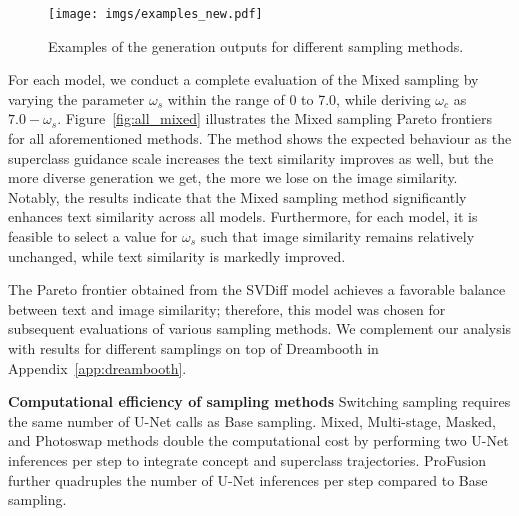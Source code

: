 \begin{figure*}[ht!]
  \centering
  \texttt{[image: imgs/examples\_new.pdf]}
  \vspace{-0.20in}
  \caption{Examples of the generation outputs for different sampling methods.}
  \label{fig:examples}
  \vspace{-0.21in}
\end{figure*}
For each model, we conduct a complete evaluation of the Mixed sampling by varying the parameter \(\omega_s\) within the range of 0 to 7.0, while deriving \(\omega_c\) as \(7.0 - \omega_s\). Figure~\ref{fig:all_mixed} illustrates the Mixed sampling Pareto frontiers for all aforementioned methods. The method shows the expected behaviour as the superclass guidance scale increases the text similarity improves as well, but the more diverse generation we get, the more we lose on the image similarity. Notably, the results indicate that the Mixed sampling method significantly enhances text similarity across all models. Furthermore, for each model, it is feasible to select a value for \(\omega_s\) such that image similarity remains relatively unchanged, while text similarity is markedly improved.

The Pareto frontier obtained from the SVDiff model achieves a favorable balance between text and image similarity; therefore, this model was chosen for subsequent evaluations of various sampling methods. We complement our analysis with results for different samplings on top of Dreambooth in Appendix~\ref{app:dreambooth}.

\textbf{Computational efficiency of sampling methods}
Switching sampling requires the same number of U-Net calls as Base sampling. Mixed, Multi-stage, Masked, and Photoswap methods double the computational cost by performing two U-Net inferences per step to integrate concept and superclass trajectories. ProFusion further quadruples the number of U-Net inferences per step compared to Base sampling.

